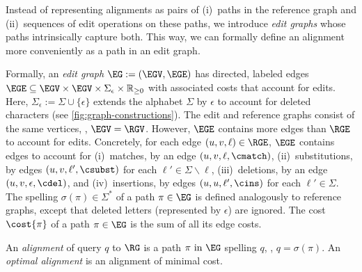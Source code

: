 Instead of representing alignments as pairs of (i)~paths in the reference graph and
(ii)~sequences of edit operations on these paths, we introduce \textit{edit
graphs} whose paths intrinsically capture both. This way, we can
formally define an alignment more conveniently as a path in an edit graph.

Formally, an \emph{edit graph} $\EG:=(\EGV,\EGE)$ has directed, labeled edges
$\EGE \subseteq \EGV \times \EGV \times \Sigma_\epsilon \times \mathbb{R}_{\geq
0}$ with associated costs that account for edits. Here, $\Sigma_\epsilon :=
\Sigma \cup \{\epsilon\}$ extends the alphabet $\Sigma$ by $\epsilon$ to account
for deleted characters (see \cref{fig:graph-constructions}).
%
The edit and reference graphs consist
of the same vertices, \ie, $\EGV=\RGV$. However, $\EGE$ contains more edges
than $\RGE$ to account for edits.
%
Concretely, for each edge $(u,v,\ell) \in \RGE$, $\EGE$ contains edges to
account for (i)~matches, by an edge $(u,v,\ell,\cmatch)$, (ii)~substitutions, by
edges $(u,v,\ell',\csubst)$ for each $\ell' \in \Sigma \backslash \ell$,
(iii)~deletions, by an edge $(u,v,\epsilon,\cdel)$, and (iv)~insertions, by
edges $(u,u,\ell',\cins)$ for each $\ell' \in \Sigma$.
%
The spelling $\sigma(\pi) \in \Sigma^*$ of a path $\pi \in \EG$ is defined
analogously to reference graphs, except that deleted letters (represented by
$\epsilon$) are ignored. The cost $\cost{\pi}$ of a path $\pi \in \EG$ is the
sum of all its edge costs.

An \emph{alignment} of query $q$ to $\RG$ is a path $\pi \text{ in } \EG$
spelling $q$, \ie, $q=\sigma(\pi)$. An \emph{optimal alignment} is an alignment
of minimal cost.
